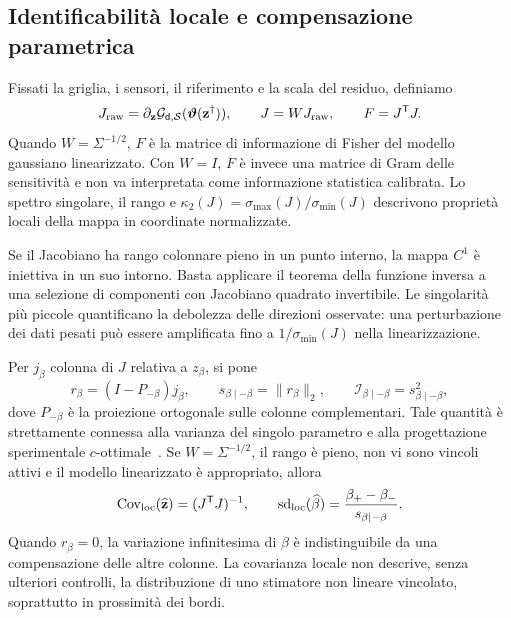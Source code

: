 \subsection{Identificabilità locale e compensazione parametrica}

Fissati la griglia, i sensori, il riferimento e la scala del residuo, definiamo
\[
 J_{\rm raw}=\partial_{\mathbf z}\mathcal{G}_{\mathsf d,\mathcal S}(\boldsymbol\vartheta(\mathbf z^\dagger)),
 \qquad J=WJ_{\rm raw},\qquad F=J^{\mathsf T}J.
\]
Quando $W=\Sigma^{-1/2}$, $F$ è la matrice di informazione di Fisher del modello gaussiano linearizzato. Con $W=I$, $F$ è invece una matrice di Gram delle sensitività e non va interpretata come informazione statistica calibrata. Lo spettro singolare, il rango e $\kappa_2(J)=\sigma_{\max}(J)/\sigma_{\min}(J)$ descrivono proprietà locali della mappa in coordinate normalizzate.

Se il Jacobiano ha rango colonnare pieno in un punto interno, la mappa $C^1$ è iniettiva in un suo intorno. Basta applicare il teorema della funzione inversa a una selezione di componenti con Jacobiano quadrato invertibile. Le singolarità più piccole quantificano la debolezza delle direzioni osservate: una perturbazione dei dati pesati può essere amplificata fino a $1/\sigma_{\min}(J)$ nella linearizzazione.

Per $j_\beta$ colonna di $J$ relativa a $z_\beta$, si pone
\begin{equation}
 r_\beta=(I-P_{-\beta})j_\beta,\qquad
 s_{\beta\mid-\beta}=\|r_\beta\|_2,\qquad
 \mathcal I_{\beta\mid-\beta}=s_{\beta\mid-\beta}^2 ,
 \label{eq:conditional-beta-info}
\end{equation}
dove $P_{-\beta}$ è la proiezione ortogonale sulle colonne complementari. Tale quantità è strettamente connessa alla varianza del singolo parametro e alla progettazione sperimentale $c$-ottimale~\citep{pukelsheim2006optimal}. Se $W=\Sigma^{-1/2}$, il rango è pieno, non vi sono vincoli attivi e il modello linearizzato è appropriato, allora
\[
 \operatorname{Cov}_{\rm loc}(\widehat{\mathbf z})=(J^{\mathsf T}J)^{-1},
 \qquad \operatorname{sd}_{\rm loc}(\widehat\beta)
 =\frac{\beta_+-\beta_-}{s_{\beta\mid-\beta}}.
\]
Quando $r_\beta=0$, la variazione infinitesima di $\beta$ è indistinguibile da una compensazione delle altre colonne. La covarianza locale non descrive, senza ulteriori controlli, la distribuzione di uno stimatore non lineare vincolato, soprattutto in prossimità dei bordi.

